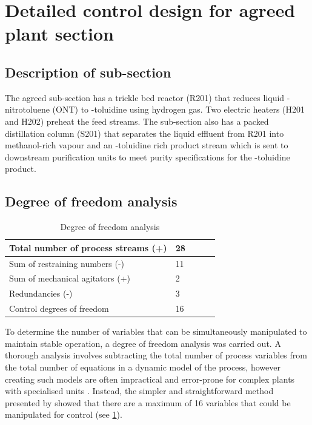 \section{Detailed control design for agreed plant section}
\label{sec:subsec}


\subsection{Description of sub-section}
The agreed sub-section has a trickle bed reactor (R201) that reduces liquid \ortho-nitrotoluene (ONT) to \ortho-toluidine using hydrogen gas. Two electric heaters (H201 and H202) preheat the feed streams. The sub-section also has a packed distillation column (S201) that separates the liquid effluent from R201 into methanol-rich vapour and an \ortho-toluidine rich product stream which is sent to downstream purification units to meet purity specifications for the \ortho-toluidine product.


\subsection{Degree of freedom analysis}
    \begin{table}
    \vspace{-\intextsep}
    \centering
        \caption{Degree of freedom analysis}
        \label{tab:dof}
    \begin{tabular}{@{}lllll@{}}
    \toprule
    Total number of process streams (+) & 28 &  &  &  \\ \midrule
    Sum of restraining numbers (-)      & 11 &  &  &  \\
    Sum of mechanical agitators (+)     & 2  &  &  &  \\
    Redundancies (-)                    & 3  &  &  &  \\
    Control degrees of freedom          & 16 &  &  &  \\ \bottomrule
    \end{tabular}
    \end{table}
To determine the number of variables that can be simultaneously manipulated to maintain stable operation, a degree of freedom analysis was carried out. A thorough analysis involves subtracting the total number of process variables from the total number of equations in a dynamic model of the process, however creating such models are often impractical and error-prone for complex plants with specialised units \cite{larsson_studies_2000}. Instead, the simpler and straightforward method presented by \textcite{murthy_konda_simple_2006} showed that there are a maximum of 16 variables that could be manipulated for control (see \cref{tab:dof}).


